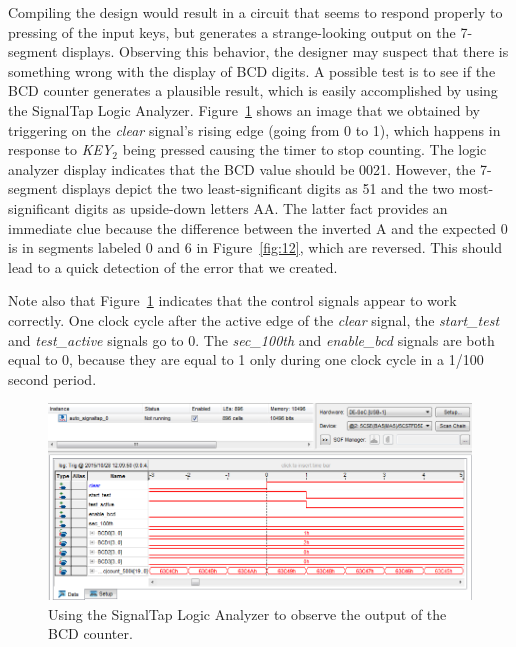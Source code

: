 \documentclass[11pt, twoside, pdftex]{article}
\begin{document}
\noindent
Compiling the design would result in a circuit that seems to respond properly
to pressing of the input keys, but generates a strange-looking output on the
7-segment displays. Observing this behavior, the designer may suspect that there
is something wrong with the display of BCD digits. A possible test is to
see if the BCD counter generates a plausible result, which is easily accomplished
by using the SignalTap Logic Analyzer. Figure~\ref{fig:22} shows an image that we obtained
by triggering on the {\it clear} signal's rising edge (going from 0 to 1), which 
happens in response to {\it KEY}$_2$ being pressed causing the timer to stop counting.
The logic analyzer display indicates that the BCD value should be 0021. However,
the 7-segment displays depict the two least-significant digits as 51 and the two
most-significant digits as upside-down letters AA. The latter fact provides an
immediate clue because the difference between the inverted A and the expected 0
is in segments labeled 0 and 6 in Figure~\ref{fig:12}, which are reversed. This should lead to
a quick detection of the error that we created.

Note also that Figure~\ref{fig:22} indicates that the control signals appear to
work correctly. One clock cycle after the active edge of the {\it clear}
signal, the {\it start\_test} and {\it test\_active} signals go to 0.
The {\it sec\_100th} and {\it enable\_bcd} signals are both equal to 0,
because they are equal to 1 only during one clock cycle in a 1/100 second period.

\begin{figure}[H]
   \begin{center}
      \includegraphics[scale=0.65]{figures/figure22.png}
   \caption{Using the SignalTap Logic Analyzer to observe the output of the BCD counter.} 
	 \label{fig:22}
	 \end{center}
\end{figure}
\end{document}
